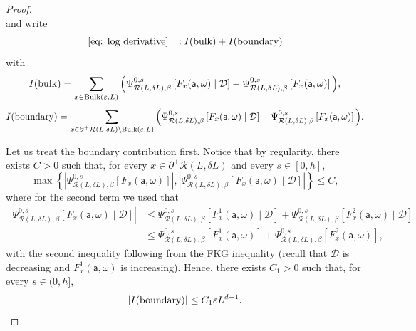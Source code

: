 \documentclass[11pt,a4paper]{article}
\numberwithin{equation}{section}
\theoremstyle{plain}
\theoremstyle{definition}
\begin{document}
\begin{proof}
\begin{equation}
\end{equation}
and write
\begin{equation}
\eqref{eq: log derivative} =: I({\rm bulk}) + I({\rm boundary})
\end{equation}
with 
\begin{equation}\label{eq: derivative formula bulk}
I({\rm bulk}) = \sum_{x \in {\rm Bulk}(\varepsilon,L)}
\Big(\Psi^{0,s}_{\mathcal R(L,\delta L),\beta}\left[F_x(\mathsf{a},\omega) \mid  \mathcal{D}\right] -\Psi^{0,s}_{\mathcal R(L,\delta L),\beta}\left[F_x(\mathsf{a},\omega)\right]\Big),
\end{equation}
\begin{equation}\label{eq: derivative formula boundary}
I({\rm boundary}) = \sum_{x \in \partial^{\pm}\mathcal{R}(L,\delta L)\setminus{\rm Bulk}(\varepsilon,L)}
\Big(\Psi^{0,s}_{\mathcal R(L,\delta L),\beta}\left[F_x(\mathsf{a},\omega) \mid  \mathcal{D}\right] -\Psi^{0,s}_{\mathcal R(L,\delta L),\beta}\left[F_x(\mathsf{a},\omega)\right]\Big).
\end{equation}

Let us treat the boundary contribution first. 
Notice that by regularity, there exists $C>0$ such that, for every $x\in \partial^{\pm}\mathcal{R}(L,\delta L)$ and every $s\in [0,h]$,
\begin{equation}
    \max \left\{ \left|\Psi^{0,s}_{\mathcal R(L,\delta L),\beta}\left[F_x(\mathsf{a},\omega)\right]\right|,  
    \left|\Psi^{0,s}_{\mathcal R(L,\delta L),\beta}\left[F_x(\mathsf{a},\omega) \mid  \mathcal{D}\right]\right| \right\} \leq C,\label{eq: general control summand}
\end{equation}
where for the second term we used that
\begin{align}
\left|\Psi^{0,s}_{\mathcal R(L,\delta L),\beta}\left[F_x(\mathsf{a},\omega) \mid  \mathcal{D}\right]\right|&\leq \Psi^{0,s}_{\mathcal R(L,\delta L),\beta}[F^1_x(\mathsf{a},\omega) \mid  \mathcal{D}] + \Psi^{0,s}_{\mathcal R(L,\delta L),\beta}[F^2_x(\mathsf{a},\omega) \mid  \mathcal{D}]
\\& \leq
\Psi^{0,s}_{\mathcal R(L,\delta L),\beta}[F^1_x(\mathsf{a},\omega)] + \Psi^{0,s}_{\mathcal R(L,\delta L),\beta}[F^2_x(\mathsf{a},\omega)],
\end{align}
with the second inequality following from the FKG inequality (recall that $\mathcal{D}$ is decreasing and $F^1_x(\mathsf{a},\omega)$ is increasing). Hence, there exists $C_1 > 0$ such that, for every $s \in (0,h]$,
\begin{equation}
|I({\rm boundary})| \leq C_1 \varepsilon L^{d-1}.
\end{equation}


\end{proof}
\end{document}
